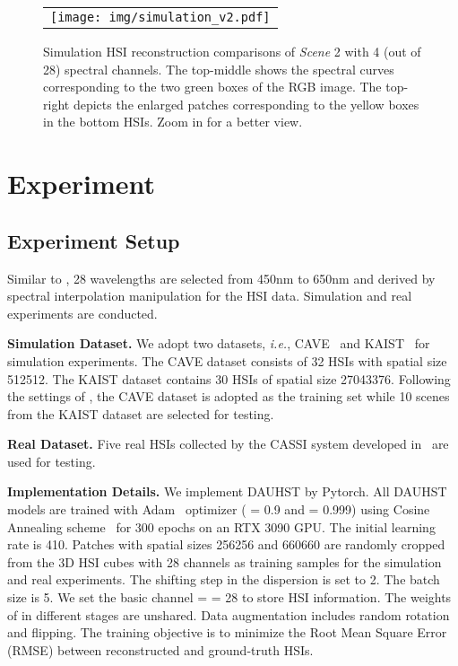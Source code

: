 \documentclass{article}
\begin{document}
\begin{figure*}[t]
	\begin{center}
		\begin{tabular}[t]{c} \hspace{-3.4mm}
			\texttt{[image: img/simulation\_v2.pdf]}
		\end{tabular}
	\end{center}
	\vspace*{-3mm}
	\caption{\small Simulation HSI reconstruction comparisons of  \emph{Scene} 2 with 4 (out of 28) spectral channels. The top-middle shows the spectral curves  corresponding to the two green boxes of the RGB image. The top-right depicts the enlarged patches corresponding to the yellow boxes in the bottom HSIs. Zoom in for a  better view.}
	\label{fig:simu}
	\vspace{-5mm}
\end{figure*}

\vspace{-1mm}
\section{Experiment} \label{sec:exp}
\vspace{-1.5mm}
\subsection{Experiment Setup}
\vspace{-0.5mm}
Similar to \cite{tsa_net,hdnet,gapnet,gsm,mst}, 28 wavelengths are selected from 450nm to 650nm and  derived by spectral interpolation manipulation for the HSI data. Simulation and real experiments are conducted. 

\textbf{Simulation Dataset.} We adopt two datasets, \emph{i.e.}, CAVE~\cite{cave} and KAIST~\cite{kaist} for simulation experiments. The CAVE  dataset consists of 32 HSIs with spatial size 512512. The KAIST dataset  contains 30 HSIs of spatial size 27043376. Following the settings of \cite{tsa_net,hdnet,gapnet,gsm,mst}, the CAVE dataset is adopted as the training set while 10 scenes from the KAIST dataset are selected for testing. 

\textbf{Real Dataset.} Five real HSIs collected by the CASSI system developed in~\cite{tsa_net} are used for testing. 

\textbf{Implementation Details.} We implement DAUHST by Pytorch. All DAUHST models are trained with Adam~\cite{adam} optimizer ( = 0.9 and  = 0.999) using Cosine Annealing scheme~\cite{cosine} for 300 epochs on an RTX 3090 GPU. The initial learning rate is 410. Patches with spatial sizes 256256 and 660660 are randomly cropped from the 3D HSI cubes with 28 channels as training samples for the simulation and real experiments.  The shifting step  in the dispersion is set to 2. 
The batch size is 5. We set the basic channel  =  = 28 to store HSI information. The weights of  in different stages are unshared. Data augmentation includes  random  rotation and flipping. The training objective is to minimize the Root Mean Square Error (RMSE) between reconstructed and ground-truth HSIs.  
\end{document}
